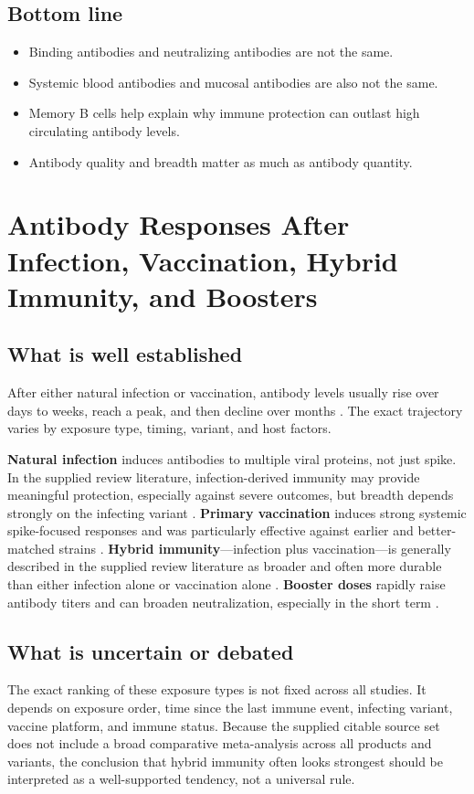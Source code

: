 \documentclass[12pt]{article}
\begin{document}
\subsection*{Bottom line}
\begin{itemize}[leftmargin=1.5em]
    \item Binding antibodies and neutralizing antibodies are not the same.
    \item Systemic blood antibodies and mucosal antibodies are also not the same.
    \item Memory B cells help explain why immune protection can outlast high circulating antibody levels.
    \item Antibody quality and breadth matter as much as antibody quantity.
\end{itemize}

\section{Antibody Responses After Infection, Vaccination, Hybrid Immunity, and Boosters}
\subsection*{What is well established}
After either natural infection or vaccination, antibody levels usually rise over days to weeks, reach a peak, and then decline over months \cite{ref3,ref5}. The exact trajectory varies by exposure type, timing, variant, and host factors.

\textbf{Natural infection} induces antibodies to multiple viral proteins, not just spike. In the supplied review literature, infection-derived immunity may provide meaningful protection, especially against severe outcomes, but breadth depends strongly on the infecting variant \cite{ref5}.  
\textbf{Primary vaccination} induces strong systemic spike-focused responses and was particularly effective against earlier and better-matched strains \cite{ref3,ref5}.  
\textbf{Hybrid immunity}---infection plus vaccination---is generally described in the supplied review literature as broader and often more durable than either infection alone or vaccination alone \cite{ref5}.  
\textbf{Booster doses} rapidly raise antibody titers and can broaden neutralization, especially in the short term \cite{ref3}.

\subsection*{What is uncertain or debated}
The exact ranking of these exposure types is not fixed across all studies. It depends on exposure order, time since the last immune event, infecting variant, vaccine platform, and immune status. Because the supplied citable source set does not include a broad comparative meta-analysis across all products and variants, the conclusion that hybrid immunity often looks strongest should be interpreted as a well-supported tendency, not a universal rule.
\end{document}
